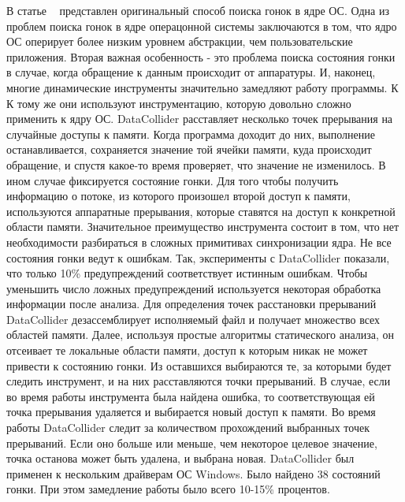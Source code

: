 В статье ~\cite{DataCollider} представлен оригинальный способ поиска гонок в ядре ОС.
Одна из проблем поиска гонок в ядре операцонной системы заключаются в том, что ядро ОС оперирует более низким уровнем абстракции, чем пользовательские приложения. Вторая важная особенность - это проблема поиска состояния гонки в случае, когда обращение к данным происходит от аппаратуры. И, наконец, многие динамические инструменты значительно замедляют работу программы. К К тому же они используют инструментацию, которую довольно сложно применить к ядру ОС. 
DataCollider расставляет несколько точек прерывания на случайные доступы к памяти. Когда программа доходит до них, выполнение останавливается, сохраняется значение той ячейки памяти, куда происходит обращение, и спустя какое-то время проверяет, что значение не изменилось. В ином случае фиксируется состояние гонки. Для того чтобы получить информацию о потоке, из которого произошел второй доступ к памяти, используются аппаратные прерывания, которые ставятся на доступ к конкретной области памяти. Значительное преимущество инструмента состоит в том, что нет необходимости разбираться в сложных примитивах синхронизации ядра.
Не все состояния гонки ведут к ошибкам. Так, эксперименты с DataCollider показали, что только 10\% предупреждений соответствует истинным ошибкам. Чтобы уменьшить число ложных предупреждений используется некоторая обработка информации после анализа.
Для определения точек расстановки прерываний DataCollider дезассемблирует исполняемый файл и получает множество всех областей памяти. Далее, используя простые алгоритмы статического анализа, он отсеивает те локальные области памяти, доступ к которым никак не может привести к состоянию гонки. Из оставшихся выбираются те, за которыми будет следить инструмент, и на них расставляются точки прерываний. В случае, если во время работы инструмента была найдена ошибка, то соответствующая ей точка прерывания удаляется и выбирается новый доступ к памяти. Во время работы DataCollider следит за количеством прохождений выбранных точек прерываний. Если оно больше или меньше, чем некоторое целевое значение, точка останова может быть удалена, и выбрана новая.
DataCollider был применен к нескольким драйверам ОС Windows. Было найдено 38 состояний гонки. При этом замедление работы было всего 10-15\% процентов. 

